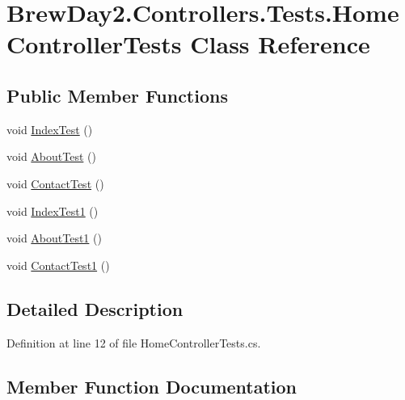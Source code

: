 \hypertarget{class_brew_day2_1_1_controllers_1_1_tests_1_1_home_controller_tests}{}\section{Brew\+Day2.\+Controllers.\+Tests.\+Home\+Controller\+Tests Class Reference}
\label{class_brew_day2_1_1_controllers_1_1_tests_1_1_home_controller_tests}
\subsection*{Public Member Functions}
\begin{DoxyCompactItemize}
\item 
void \mbox{\hyperlink{class_brew_day2_1_1_controllers_1_1_tests_1_1_home_controller_tests_afd867feb315bdcfe911bffb83d007574}{Index\+Test}} ()
\item 
void \mbox{\hyperlink{class_brew_day2_1_1_controllers_1_1_tests_1_1_home_controller_tests_ab11fd2c4d4c25d1b65a7c938077175a3}{About\+Test}} ()
\item 
void \mbox{\hyperlink{class_brew_day2_1_1_controllers_1_1_tests_1_1_home_controller_tests_a2b748356e0fc574f74cfd850118d4041}{Contact\+Test}} ()
\item 
void \mbox{\hyperlink{class_brew_day2_1_1_controllers_1_1_tests_1_1_home_controller_tests_a2ef5e19f1e15dd6463ef8383ef5756d0}{Index\+Test1}} ()
\item 
void \mbox{\hyperlink{class_brew_day2_1_1_controllers_1_1_tests_1_1_home_controller_tests_a9420aeffdd8da45c8513fe3311a5fb35}{About\+Test1}} ()
\item 
void \mbox{\hyperlink{class_brew_day2_1_1_controllers_1_1_tests_1_1_home_controller_tests_a325981fb0a7f6991f7594ab333d5ea93}{Contact\+Test1}} ()
\end{DoxyCompactItemize}


\subsection{Detailed Description}


Definition at line 12 of file Home\+Controller\+Tests.\+cs.



\subsection{Member Function Documentation}
\mbox{\label{class_brew_day2_1_1_controllers_1_1_tests_1_1_home_controller_tests_ab11fd2c4d4c25d1b65a7c938077175a3}} 
